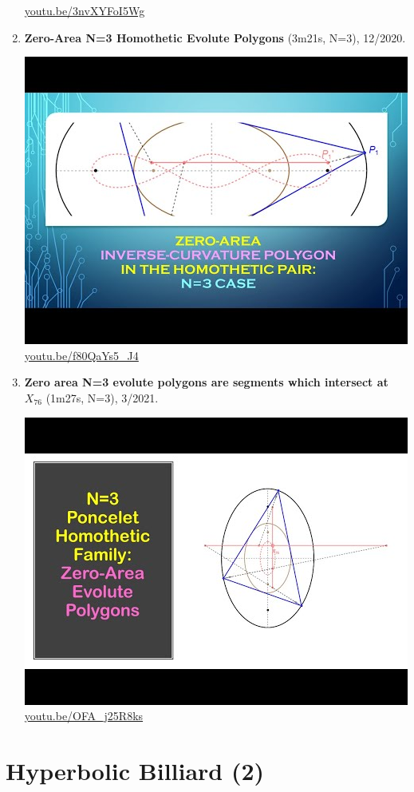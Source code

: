 \documentclass[12pt]{amsart}
\begin{document}
\begin{enumerate}[resume]
\begin{center}
\href{https://youtu.be/3nvXYFoI5Wg}{\url{youtu.be/3nvXYFoI5Wg}}\end{center}
% 
\item \textbf{Zero-Area N=3 Homothetic Evolute Polygons} (3m21s, N=3), 12/2020. 
\begin{center}\includegraphics[width=.5\textwidth]{pics/f80QaYs5_J4.jpg} \\ 
\href{https://youtu.be/f80QaYs5_J4}{\url{youtu.be/f80QaYs5\_J4}}\end{center}
% 
\item \textbf{Zero area N=3 evolute polygons are segments which intersect at $X_{76}$} (1m27s, N=3), 3/2021. 
\begin{center}\includegraphics[width=.5\textwidth]{pics/OFA_j25R8ks.jpg} \\ 
\href{https://youtu.be/OFA_j25R8ks}{\url{youtu.be/OFA\_j25R8ks}}\end{center}
% 
\end{enumerate}

\section{Hyperbolic Billiard (2)}
\end{document}
